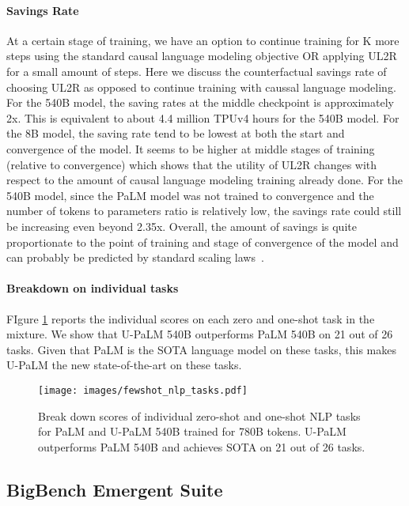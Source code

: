 \documentclass{article}
\newcommand{\methodname}{UL2R\xspace}
\newcommand{\modelname}{U-PaLM\xspace}
\begin{document}
\paragraph{Savings Rate} At a certain stage of training, we have an option to continue training for K more steps using the standard causal language modeling objective OR applying \methodname for a small amount of steps. Here we discuss the counterfactual savings rate of choosing \methodname as opposed to continue training with caussal language modeling. For the 540B model, the saving rates at the middle checkpoint is approximately 2x. This is equivalent to about 4.4 million TPUv4 hours for the 540B model. For the 8B model, the saving rate tend to be lowest at both the start and convergence of the model. It seems to be higher at middle stages of training (relative to convergence) which shows that the utility of \methodname changes with respect to the amount of causal language modeling training already done. For the 540B model, since the PaLM model was not trained to convergence and the number of tokens to parameters ratio is relatively low, the savings rate could still be increasing even beyond 2.35x. Overall, the amount of savings is quite proportionate to the point of training and stage of convergence of the model and can probably be predicted by standard scaling laws~\citep{kaplan2020scaling,hoffmann2022training}.

\paragraph{Breakdown on individual tasks} FIgure \ref{fig:fewshot_nlp_tasks} reports the individual scores on each zero and one-shot task in the mixture. We show that \modelname 540B outperforms PaLM 540B on 21 out of 26 tasks. Given that PaLM is the SOTA language model on these tasks, this makes \modelname the new state-of-the-art on these tasks.



\begin{figure}[H]
     \centering
     \texttt{[image: images/fewshot\_nlp\_tasks.pdf]}
    \caption{Break down scores of individual zero-shot and one-shot NLP tasks for PaLM and \modelname 540B trained for 780B tokens. \modelname outperforms PaLM 540B and achieves SOTA on 21 out of 26 tasks.}
    \label{fig:fewshot_nlp_tasks}
\end{figure}


\subsection{BigBench Emergent Suite} 
\end{document}
